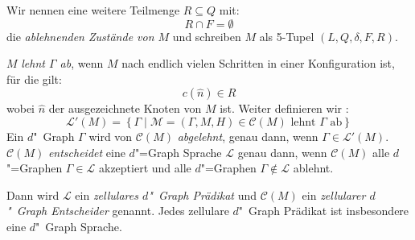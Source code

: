 \documentclass[11pt]{article}
\newcommand{\defWord}[1]{\emph{#1}}
\begin{document}
\begin{definition}
	Wir nennen eine weitere Teilmenge $R \subseteq Q$ mit: 
	\begin{displaymath}
		R \cap F = \emptyset
	\end{displaymath} 
	die \defWord{ablehnenden Zustände von $M$} und schreiben $M$ als 5-Tupel $\left(L, Q, \delta, F, R\right)$.
	
	$M$ \defWord{lehnt $\Gamma$ ab}, wenn $M$ nach endlich vielen Schritten in einer Konfiguration ist, für die gilt: 
	\begin{displaymath}
		c(\hat{n}) \in R
	\end{displaymath}
	wobei $\hat{n}$ der ausgezeichnete Knoten von $M$ ist.
	Weiter definieren wir : 
	\begin{displaymath}
		\mathcal{L}'(M) = \left\{\Gamma \mid \mathcal{M} = \left(\Gamma, M, H\right) \in \mathcal{C}(M) \text{ lehnt } \Gamma \text{ ab}\right\}
	\end{displaymath}
	Ein $d$"~Graph $\Gamma$ wird von $\mathcal{C}(M)$ \defWord{abgelehnt}, genau dann, wenn $\Gamma \in \mathcal{L}'(M)$.
	$\mathcal{C}(M)$ \defWord{entscheidet} eine $d$"=Graph Sprache $\mathcal{L}$ genau dann, wenn $\mathcal{C}(M)$ alle $d$"=Graphen $\Gamma \in \mathcal{L}$ akzeptiert und alle $d$"=Graphen $\Gamma \notin \mathcal{L}$ ablehnt.
	
	Dann wird $\mathcal{L}$ ein \defWord{zellulares $d$"~Graph Prädikat} und $\mathcal{C}(M)$ ein \defWord{zellularer $d$"~Graph Entscheider} genannt. 
	Jedes zellulare $d$"~Graph Prädikat ist insbesondere eine $d$"~Graph Sprache.
\end{definition}
\end{document}
